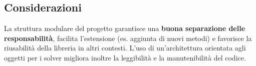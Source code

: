 \subsection{Considerazioni}

La struttura modulare del progetto garantisce una \textbf{buona separazione delle responsabilità}, facilita l’estensione (es. aggiunta di nuovi metodi) e favorisce la riusabilità della libreria in altri contesti. L’uso di un’architettura orientata agli oggetti per i solver migliora inoltre la leggibilità e la manutenibilità del codice.